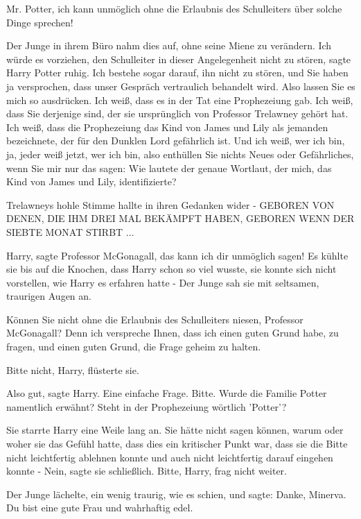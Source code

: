 \glqq{}Mr. Potter, ich kann unmöglich ohne die Erlaubnis des Schulleiters über
solche Dinge sprechen!\grqq{}

Der Junge in ihrem Büro nahm dies auf, ohne seine Miene zu verändern. \glqq{}Ich
würde es vorziehen, den Schulleiter in dieser Angelegenheit nicht zu
stören\grqq{}, sagte Harry Potter ruhig. \glqq{}Ich bestehe sogar darauf, ihn
nicht zu stören, und Sie haben ja versprochen, dass unser Gespräch vertraulich
behandelt wird. Also lassen Sie es mich so ausdrücken. Ich weiß, dass es in der
Tat eine Prophezeiung gab. Ich weiß, dass Sie derjenige sind, der sie
ursprünglich von Professor Trelawney gehört hat. Ich weiß, dass die Prophezeiung
das Kind von James und Lily als jemanden bezeichnete, der für den Dunklen Lord
gefährlich ist. Und ich weiß, wer ich bin, ja, jeder weiß jetzt, wer ich bin,
also enthüllen Sie nichts Neues oder Gefährliches, wenn Sie mir nur das sagen:
Wie lautete der genaue Wortlaut, der mich, das Kind von James und Lily,
identifizierte?\grqq{}

Trelawneys hohle Stimme hallte in ihren Gedanken wider - GEBOREN VON DENEN, DIE IHM DREI MAL
BEKÄMPFT HABEN, GEBOREN WENN DER SIEBTE MONAT STIRBT ...

\glqq{}Harry\grqq{}, sagte Professor McGonagall, \glqq{}das kann ich dir unmöglich
sagen!\grqq{} Es kühlte sie bis auf die Knochen, dass Harry schon so viel wusste, sie
konnte sich nicht vorstellen, wie Harry es erfahren hatte - Der Junge sah sie
mit seltsamen, traurigen Augen an.

\glqq{}Können Sie nicht ohne die Erlaubnis des Schulleiters niesen, Professor
McGonagall? Denn ich verspreche Ihnen, dass ich einen guten Grund habe, zu
fragen, und einen guten Grund, die Frage geheim zu halten.\grqq{}

\glqq{}Bitte nicht, Harry\grqq{}, flüsterte sie.

\glqq{}Also gut\grqq{}, sagte Harry. \glqq{}Eine einfache Frage. Bitte. Wurde die
Familie Potter namentlich erwähnt? Steht in der Prophezeiung wörtlich 'Potter'?\grqq{}

Sie starrte Harry eine Weile lang an. Sie hätte nicht sagen können, warum oder
woher sie das Gefühl hatte, dass dies ein kritischer Punkt war, dass sie die
Bitte nicht leichtfertig ablehnen konnte und auch nicht leichtfertig darauf
eingehen konnte - \glqq{}Nein\grqq{}, sagte sie schließlich. \glqq{}Bitte, Harry,
frag nicht weiter.\grqq{}

Der Junge lächelte, ein wenig traurig, wie es schien, und sagte: \glqq{}Danke,
Minerva. Du bist eine gute Frau und wahrhaftig edel.\grqq{}

